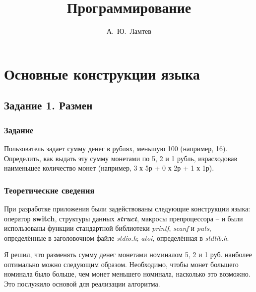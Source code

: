 \documentclass[12pt,a4paper]{report}
\author{А.~Ю.~Ламтев}
\title{Программирование}
\begin{document}
\maketitle
\tableofcontents{}

\chapter{Основные конструкции языка}
\section{Задание 1. Размен}
\subsection{Задание}
\hspace{\parindent}
Пользователь задает сумму денег в рублях, меньшую 100 (например, 16). Определить, как выдать эту сумму монетами по 5, 2 и 1 рубль, израсходовав наименьшее количество монет (например, 3 х 5р + 0 х 2р + 1 х 1р).
\subsection{Теоретические сведения}

\hspace{\parindent}
При разработке приложения были задействованы следующие конструкции языка: оператор \textbf{switch}, структуры данных \textit{\textbf{struct}}, макросы препроцессора -- и были использованы функции стандартной библиотеки \textit{printf}, \textit{scanf} и \textit{puts}, определённые в заголовочном файле \textit{stdio.h}; \textit{atoi}, определённая в \textit{stdlib.h}. 

\hspace{\parindent}
Я решил, что разменять сумму денег монетами номиналом 5, 2 и 1 руб. наиболее оптимально можно следующим образом. Необходимо, чтобы монет большего номинала было больше, чем монет меньшего номинала, насколько это возможно. Это послужило основой для реализации алгоритма.
\end{document}
